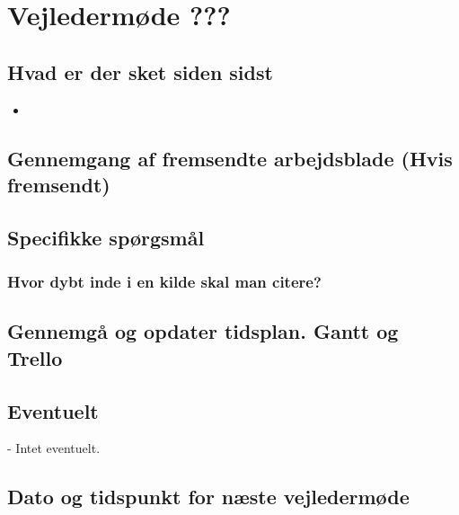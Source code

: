 \newpage
\section{Vejledermøde ???}
\subsection{Hvad er der sket siden sidst}
    \begin{itemize}
        \item 
    \end{itemize}
\subsection{Gennemgang af fremsendte arbejdsblade (Hvis fremsendt)}

\subsection{Specifikke spørgsmål}
\subsubsection{Hvor dybt inde i en kilde skal man citere?}

\subsection{Gennemgå og opdater tidsplan. Gantt og Trello}

\subsection{Eventuelt}
- Intet eventuelt.

\subsection{Dato og tidspunkt for næste vejledermøde}
 